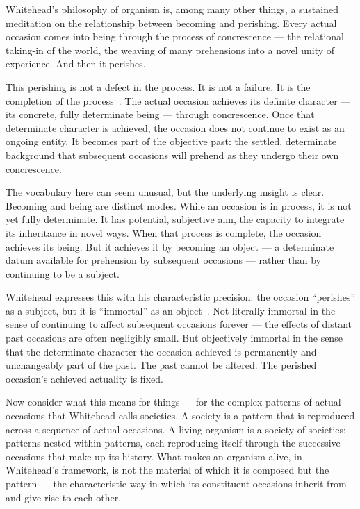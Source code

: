 Whitehead's philosophy of organism is, among many other things, a sustained meditation on the relationship between becoming and perishing.
Every actual occasion comes into being through the process of concrescence --- the relational taking-in of the world, the weaving of many prehensions into a novel unity of experience.
And then it perishes.

This perishing is not a defect in the process.
It is not a failure.
It is the completion of the process~\citep{Whitehead1929}.
The actual occasion achieves its definite character --- its concrete, fully determinate being --- through concrescence.
Once that determinate character is achieved, the occasion does not continue to exist as an ongoing entity.
It becomes part of the objective past: the settled, determinate background that subsequent occasions will prehend as they undergo their own concrescence.

The vocabulary here can seem unusual, but the underlying insight is clear.
Becoming and being are distinct modes.
While an occasion is in process, it is not yet fully determinate.
It has potential, subjective aim, the capacity to integrate its inheritance in novel ways.
When that process is complete, the occasion achieves its being.
But it achieves it by becoming an object --- a determinate datum available for prehension by subsequent occasions --- rather than by continuing to be a subject.

Whitehead expresses this with his characteristic precision: the occasion ``perishes'' as a subject, but it is ``immortal'' as an object~\citep{Whitehead1929}.
Not literally immortal in the sense of continuing to affect subsequent occasions forever --- the effects of distant past occasions are often negligibly small.
But objectively immortal in the sense that the determinate character the occasion achieved is permanently and unchangeably part of the past.
The past cannot be altered.
The perished occasion's achieved actuality is fixed.

Now consider what this means for things --- for the complex patterns of actual occasions that Whitehead calls societies.
A society is a pattern that is reproduced across a sequence of actual occasions.
A living organism is a society of societies: patterns nested within patterns, each reproducing itself through the successive occasions that make up its history.
What makes an organism alive, in Whitehead's framework, is not the material of which it is composed but the pattern --- the characteristic way in which its constituent occasions inherit from and give rise to each other.

